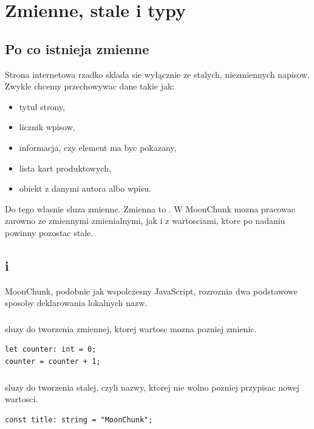 \chapter{Zmienne, stale i typy}

\section{Po co istnieja zmienne}
Strona internetowa rzadko sklada sie wyłącznie ze stalych, niezmiennych napisow.
Zwykle chcemy przechowywac dane takie jak:

\begin{itemize}
  \item tytul strony,
  \item licznik wpisow,
  \item informacja, czy element ma byc pokazany,
  \item lista kart produktowych,
  \item obiekt z danymi autora albo wpisu.
\end{itemize}

Do tego wlasnie sluza zmienne. Zmienna to .
W MoonChunk mozna pracowac zarowno ze zmiennymi zmienialnymi, jak i z wartosciami,
ktore po nadaniu powinny pozostac stale.

\section{ i }
MoonChunk, podobnie jak wspolczesny JavaScript, rozroznia dwa podstawowe sposoby
deklarowania lokalnych nazw.

\subsection*{}
 sluzy do tworzenia zmiennej, ktorej wartosc mozna pozniej zmienic.

\begin{lstlisting}[style=moonchunk,caption={Zmienna deklarowana przez let}]
let counter: int = 0;
counter = counter + 1;
\end{lstlisting}

\subsection*{}
 sluzy do tworzenia stalej, czyli nazwy, ktorej nie wolno pozniej przypisac
nowej wartosci.

\begin{lstlisting}[style=moonchunk,caption={Stala deklarowana przez const}]
const title: string = "MoonChunk";
\end{lstlisting}

